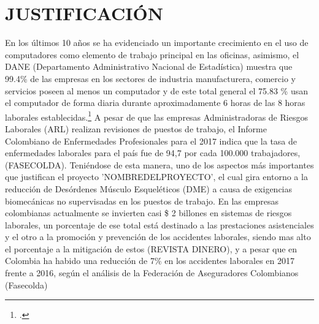 \chapter{JUSTIFICACIÓN}
En los últimos 10 años se ha evidenciado un importante crecimiento en el uso de computadores como elemento de trabajo principal en las oficinas, asimismo, el DANE (Departamento Administrativo Nacional de Estadística)  muestra que 99.4\% de las empresas en los sectores de industria manufacturera, comercio y servicios poseen al menos un computador y de este total general el 75.83 \% usan el computador de forma diaria durante aproximadamente 6 horas de las 8 horas laborales establecidas.\footcite[]{Dane2013IndicadoresEmpresas}
A pesar de que las empresas Administradoras de Riesgos Laborales (ARL) realizan revisiones de puestos de trabajo, el Informe Colombiano de Enfermedades Profesionales para el 2017 indica que la tasa de enfermedades laborales para el país fue de 94,7 por cada 100.000 trabajadores, (FASECOLDA). Teniéndose de esta manera, uno de los aspectos más importantes que justifican el proyecto 'NOMBREDELPROYECTO', el cual gira entorno a la reducción de Desórdenes Músculo Esqueléticos (DME) a causa de exigencias biomecánicas no supervisadas en los puestos de trabajo.
En las empresas colombianas actualmente se invierten casi \$ 2 billones en sistemas de riesgos laborales, un porcentaje de ese total está destinado a las prestaciones asistenciales y el otro a la promoción y prevención de los accidentes laborales, siendo mas alto el porcentaje a la mitigación de estos  (REVISTA DINERO), y a pesar que en Colombia ha habido una reducción de 7\% en los accidentes laborales en 2017 frente a 2016, según el análisis de la Federación de Aseguradores Colombianos (Fasecolda)






